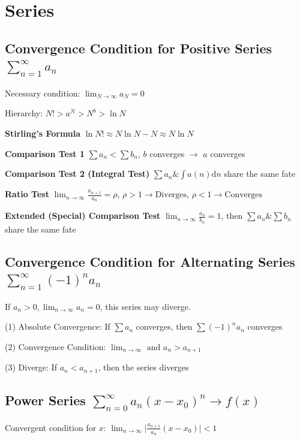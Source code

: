 \documentclass[10pt]{article}
\newcommand{\dd}{\mathrm{d}}
\begin{document}
\section{Series}

\subsection[Convergence Condition for Positive Series]{Convergence Condition for Positive Series $\sum\limits_{n=1}^{\infty} a_n$}

Necessary condition: $\lim_{N\to \infty} a_N = 0$

Hierarchy: $N! > a^N > N^b > \ln{N}$

\textbf{Stirling's Formula} $\ln{N!} \approx N\ln{N}-N \approx N\ln{N}$

\textbf{Comparison Test 1} $\sum a_n < \sum b_n$, $b$ converges $\to$ $a$ converges

\textbf{Comparison Test 2 (Integral Test)} $\sum a_n \& \int a(n) \dd n$ share the same fate

\textbf{Ratio Test}
	$\lim_{n\to \infty} \frac{a_{n+1}}{a_n} = \rho$, $\rho > 1 \to \text{Diverges}$, $\rho < 1 \to \text{Converges}$

\textbf{Extended (Special) Comparison Test}
$\lim_{n\to \infty} \frac{a_n}{b_n} = 1$, then $\sum a_n \& \sum b_n$ share the same fate

\subsection[Convergence Condition for Alternating Series]{Convergence Condition for Alternating Series $\sum\limits_{n=1}^{\infty} (-1)^n a_n$}

If $a_n>0, \lim_{n\to\infty} a_n = 0$, this series may diverge.

(1) Absolute Convergence: If $\sum a_n$ converges, then $\sum (-1)^n a_n$ converges

(2) Convergence Condition: $\lim_{n\to\infty} \text{ and } a_n > a_{n+1}$

(3) Diverge: If $a_n < a_{n+1}$, then the series diverges

\subsection[Power Series]{Power Series $\sum_{n=0}^\infty a_n (x-x_0)^n \rightarrow f(x)$}

Convergent condition for $x$:
$\lim_{n\to\infty} \big| \frac{a_{n+1}}{a_n} (x-x_0) \big| < 1$
\end{document}
